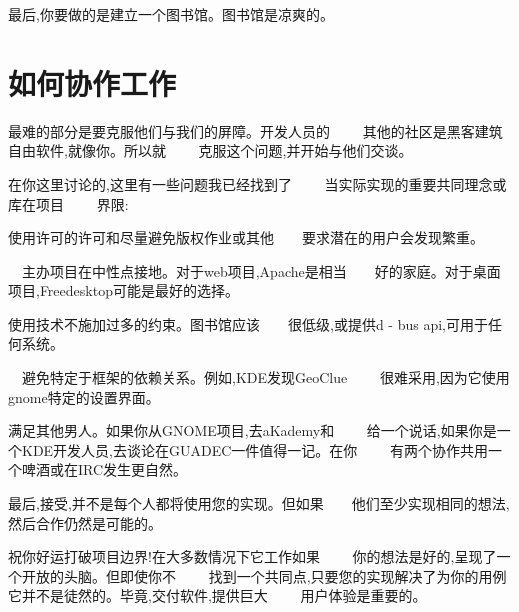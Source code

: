 最后,你要做的是建立一个图书馆。图书馆是凉爽的。

\section*{如何协作工作}

最难的部分是要克服他们与我们的屏障。开发人员的　　
其他的社区是黑客建筑自由软件,就像你。所以就　　
克服这个问题,并开始与他们交谈。

在你这里讨论的,这里有一些问题我已经找到了　　
当实际实现的重要共同理念或库在项目　　
界限:

\begin{逐条列记}
\item 使用许可的许可和尽量避免版权作业或其他　　要求潜在的用户会发现繁重。
\item 　主办项目在中性点接地。对于web项目,Apache是相当　　好的家庭。对于桌面项目,Freedesktop可能是最好的选择。
\item 使用技术不施加过多的约束。图书馆应该　　很低级,或提供d - bus api,可用于任何系统。
\item 　避免特定于框架的依赖关系。例如,KDE发现GeoClue 　　很难采用,因为它使用gnome特定的设置界面。
\item 满足其他男人。如果你从GNOME项目,去aKademy和　　
给一个说话,如果你是一个KDE开发人员,去谈论在GUADEC一件值得一记。在你　　
有两个协作共用一个啤酒或在IRC发生更自然。
\item 最后,接受,并不是每个人都将使用您的实现。但如果　　他们至少实现相同的想法,然后合作仍然是可能的。
\end{逐条列记}

祝你好运打破项目边界!在大多数情况下它工作如果　　
你的想法是好的,呈现了一个开放的头脑。但即使你不　　
找到一个共同点,只要您的实现解决了为你的用例　　
它并不是徒然的。毕竟,交付软件,提供巨大　　
用户体验是重要的。
